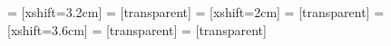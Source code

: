 \documentclass{article}
\begin{document}
\newcommand{\exampleFile}[0]{XXXXXXXXXX}

\begin{figure}
 = [xshift=3.2cm]
 = [transparent]
 = [xshift=2cm]
 = [transparent]
 = [xshift=3.6cm]
 = [transparent]
 = [transparent]
	
	\drawheaderfwd 
\end{figure}

\begin{figure}
	\bwdIndexLayout	
	
\drawheaderbwd
\markFwdBlocksInBwdIndex
\printBlAndCBWT \\ 
\printBmAndMinDepth


\printFac
\end{figure}
\end{document}
